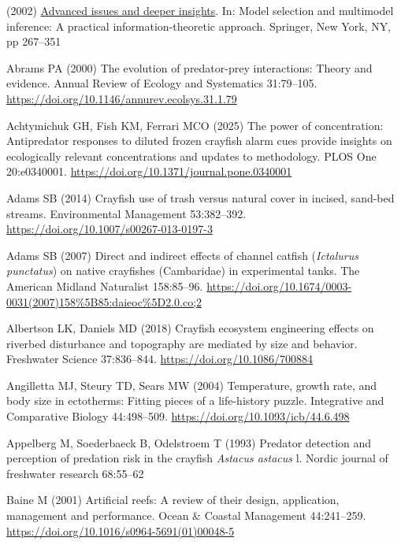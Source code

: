 \documentclass[
  12pt,
  a4paper,
  oneside]{scrbook}
\newlength{\cslhangindent}
\newenvironment{CSLReferences}[2] %
 {\begin{list}{}{%
  \setlength{\itemindent}{0pt}
  \setlength{\leftmargin}{0pt}
  \setlength{\parsep}{0pt}
  \ifodd #1
   \setlength{\leftmargin}{\cslhangindent}
   \setlength{\itemindent}{-1\cslhangindent}
  \fi
  \setlength{\itemsep}{#2\baselineskip}}}
 {\end{list}}
\begin{document}
\protect{}\label{refs}
\begin{CSLReferences}{1}{1}
(2002) \href{https://doi.org/10.1007/978-0-387-22456-5_6}{Advanced
issues and deeper insights}. In: Model selection and multimodel
inference: A practical information-theoretic approach. Springer, New
York, NY, pp 267--351

Abrams PA (2000) The evolution of predator-prey interactions: Theory and
evidence. Annual Review of Ecology and Systematics 31:79--105.
\url{https://doi.org/10.1146/annurev.ecolsys.31.1.79}

Achtymichuk GH, Fish KM, Ferrari MCO (2025) The power of concentration:
Antipredator responses to diluted frozen crayfish alarm cues provide
insights on ecologically relevant concentrations and updates to
methodology. PLOS One 20:e0340001.
\url{https://doi.org/10.1371/journal.pone.0340001}

Adams SB (2014) Crayfish use of trash versus natural cover in incised,
sand-bed streams. Environmental Management 53:382--392.
\url{https://doi.org/10.1007/s00267-013-0197-3}

Adams SB (2007) Direct and indirect effects of channel catfish
({\emph{Ictalurus punctatus}}) on native crayfishes ({Cambaridae}) in
experimental tanks. The American Midland Naturalist 158:85--96.
\url{https://doi.org/10.1674/0003-0031(2007)158\%5B85:daieoc\%5D2.0.co;2}

Albertson LK, Daniels MD (2018) Crayfish ecosystem engineering effects
on riverbed disturbance and topography are mediated by size and
behavior. Freshwater Science 37:836--844.
\url{https://doi.org/10.1086/700884}

Angilletta MJ, Steury TD, Sears MW (2004) Temperature, growth rate, and
body size in ectotherms: Fitting pieces of a life-history puzzle.
Integrative and Comparative Biology 44:498--509.
\url{https://doi.org/10.1093/icb/44.6.498}

Appelberg M, Soederbaeck B, Odelstroem T (1993) Predator detection and
perception of predation risk in the crayfish {\emph{Astacus astacus}} l.
Nordic journal of freshwater research 68:55--62

Baine M (2001) Artificial reefs: A review of their design, application,
management and performance. Ocean \& Coastal Management 44:241--259.
\url{https://doi.org/10.1016/s0964-5691(01)00048-5}


\end{CSLReferences}
\end{document}
